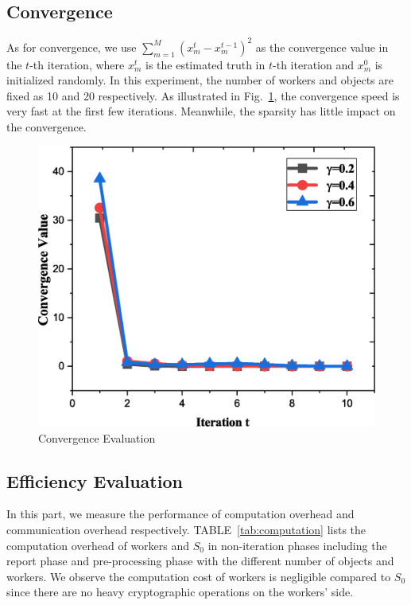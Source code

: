 \documentclass[conference]{IEEEtran}
\begin{document}
\subsection{Convergence}
As for convergence, we use $\sum\limits_{m=1}^M (x_m^t - x_m^{t-1})^2$ as the convergence value in the $t$-th iteration, where $x_m^t$ is the estimated truth in $t$-th iteration and $x_m^0$ is initialized randomly.
In this experiment, the number of workers and objects are fixed as 10 and 20 respectively.
As illustrated in Fig.~\ref{fig:conver}, the convergence speed is very fast at the first few iterations.
Meanwhile, the sparsity has little impact on the convergence.
\begin{figure}[htbp]
  \centering
  \includegraphics[width=0.60\linewidth]{figures/conver.eps}
  \caption{Convergence Evaluation}
  \label{fig:conver}
\end{figure}

\subsection{Efficiency Evaluation}
In this part, we measure the performance of computation overhead and communication overhead respectively.
TABLE~\ref{tab:computation} lists the computation overhead of workers and $S_0$ in non-iteration phases including the report phase and pre-processing phase with the different number of objects and workers.
We observe the computation cost of workers is negligible compared to $S_0$ since there are no heavy cryptographic operations on the workers' side.
\end{document}
